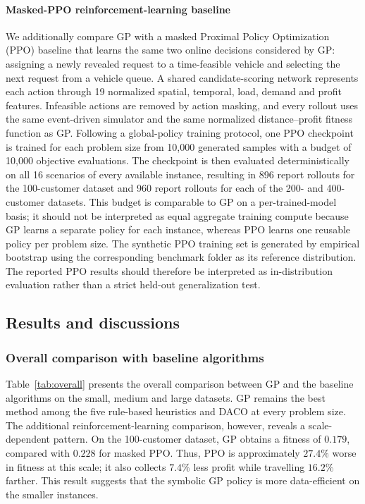 \documentclass[pdflatex]{sn-jnl}
\begin{document}
\paragraph{Masked-PPO reinforcement-learning baseline}
We additionally compare GP with a masked Proximal Policy Optimization (PPO)
baseline that learns the same two online decisions considered by GP: assigning
a newly revealed request to a time-feasible vehicle and selecting the next
request from a vehicle queue. A shared candidate-scoring network represents
each action through 19 normalized spatial, temporal, load, demand and profit
features. Infeasible actions are removed by action masking, and every rollout
uses the same event-driven simulator and the same normalized distance--profit
fitness function as GP. Following a global-policy training protocol, one PPO
checkpoint is trained for each problem size from 10,000 generated samples with
a budget of 10,000 objective evaluations. The checkpoint is then evaluated
deterministically on all 16 scenarios of every available instance, resulting in
896 report rollouts for the 100-customer dataset and 960 report rollouts for
each of the 200- and 400-customer datasets. This budget is comparable to GP on
a per-trained-model basis; it should not be interpreted as equal aggregate
training compute because GP learns a separate policy for each instance, whereas
PPO learns one reusable policy per problem size. The synthetic PPO training
set is generated by empirical bootstrap using the corresponding benchmark
folder as its reference distribution. The reported PPO results should
therefore be interpreted as in-distribution evaluation rather than a strict
held-out generalization test.


\subsection{Results and discussions}

\subsubsection{Overall comparison with baseline algorithms}
Table~\ref{tab:overall} presents the overall comparison between GP and the
baseline algorithms on the small, medium and large datasets. GP remains the
best method among the five rule-based heuristics and DACO at every problem
size. The additional reinforcement-learning comparison, however, reveals a
scale-dependent pattern. On the 100-customer dataset, GP obtains a fitness of
$0.179$, compared with $0.228$ for masked PPO. Thus, PPO is approximately
$27.4\%$ worse in fitness at this scale; it also collects $7.4\%$ less profit
while travelling $16.2\%$ farther. This result suggests that the symbolic GP
policy is more data-efficient on the smaller instances.
\end{document}
